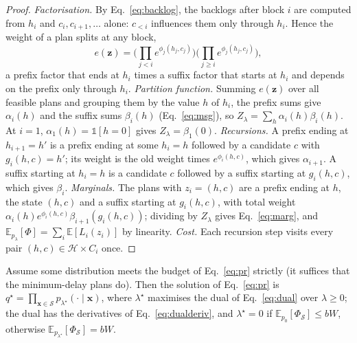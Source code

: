 \begin{proof}
\emph{Factorisation.} By Eq.~\eqref{eq:backlog}, the backlogs after block $i$ are computed from $h_i$ and
$c_i,c_{i+1},\dots$ alone: $c_{<i}$ influences them only through $h_i$. Hence the weight of a plan splits at any block,
\[
e(\bm{z})=\Big(\textstyle\prod_{j<i}e^{\phi_j(h_j,c_j)}\Big)\Big(\textstyle\prod_{j\ge i}e^{\phi_j(h_j,c_j)}\Big),
\]
a prefix factor that ends at $h_i$ times a suffix factor that starts at $h_i$ and depends on the prefix only through
$h_i$.
\emph{Partition function.} Summing $e(\bm{z})$ over all feasible plans and grouping them by the value $h$ of $h_i$, the
prefix sums give $\alpha_i(h)$ and the suffix sums $\beta_i(h)$ (Eq.~\eqref{eq:msg}), so $Z_\lambda=\sum_h\alpha_i(h)\beta_i(h)$.
At $i=1$, $\alpha_1(h)=\mathds{1}[h=0]$ gives $Z_\lambda=\beta_1(0)$.
\emph{Recursions.} A prefix ending at $h_{i+1}=h'$ is a prefix ending at some $h_i=h$ followed by a candidate $c$ with
$g_i(h,c)=h'$; its weight is the old weight times $e^{\phi_i(h,c)}$, which gives $\alpha_{i+1}$. A suffix starting at
$h_i=h$ is a candidate $c$ followed by a suffix starting at $g_i(h,c)$, which gives $\beta_i$.
\emph{Marginals.} The plans with $z_i=(h,c)$ are a prefix ending at $h$, the state $(h,c)$ and a suffix starting at
$g_i(h,c)$, with total weight $\alpha_i(h)e^{\phi_i(h,c)}\beta_{i+1}(g_i(h,c))$; dividing by $Z_\lambda$ gives
Eq.~\eqref{eq:marg}, and $\mathbb{E}_{p_\lambda}[\Phi]=\sum_i\mathbb{E}[L_i(z_i)]$ by linearity.
\emph{Cost.} Each recursion step visits every pair $(h,c)\in\mathcal{H}\times C_i$ once.
\end{proof}

\begin{proposition}
\label{prop:pr}
Assume some distribution meets the budget of Eq.~\eqref{eq:pr} strictly (it suffices that the minimum-delay plans do).
Then the solution of Eq.~\eqref{eq:pr} is $q^\star=\prod_{\bm{x}\in\mathcal{S}}p_{\lambda^\star}(\cdot\mid\bm{x})$, where
$\lambda^\star$ maximises the dual of Eq.~\eqref{eq:dual} over $\lambda\ge0$; the dual has the derivatives of
Eq.~\eqref{eq:dualderiv}, and $\lambda^\star=0$ if $\mathbb{E}_{p_0}[\Phi_\mathcal{S}]\le bW$, otherwise
$\mathbb{E}_{p_{\lambda^\star}}[\Phi_\mathcal{S}]=bW$.
\end{proposition}

